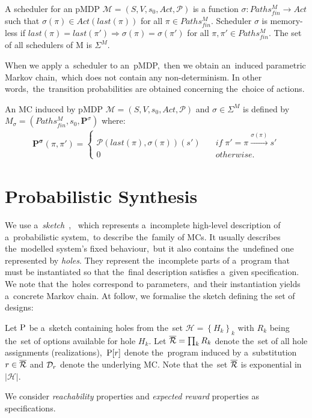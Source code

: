 \begin{definition}[Scheduler]
A scheduler for an pMDP $\mathcal{M} = (S, V, s_0, Act, \mathcal{P})$ is a function $\sigma: Paths_{fin}^{M} \rightarrow Act$ such that $\sigma(\pi) \in Act(last(\pi))$ for all $\pi \in Paths_{fin}^{M}$.
Scheduler $\sigma$ is memory-less if $last(\pi) = last(\pi') \Longrightarrow \sigma(\pi) = \sigma(\pi')$ for all $\pi, \pi' \in Paths_{fin}^{M}$.
The set of all schedulers of M is $\Sigma^M$.
\end{definition}
\noindent 
When we apply a~scheduler to an~pMDP,~then we obtain an~induced parametric Markov chain,~which does not contain any non-determinism.
In other words,~the~transition probabilities are obtained concerning the~choice of actions.

\begin{definition}[Induced MC] \label{def:incuded_mc}
\cite{cegar}
An MC induced by pMDP $\mathcal{M} = (S, V, s_0, Act, \mathcal{P})$ and $\sigma \in \Sigma^M$ is defined by $M_{\sigma} = ( Paths_{fin}^{M}, s_0, \mathbf{P}^{\sigma})$ where:
\begin{align*}
    \mathbf{P^{\sigma}}(\pi, \pi') = 
    \begin{cases}
        \mathcal{P}(last(\pi), \sigma(\pi))(s') \quad & if \; \pi' = \pi \overset{\sigma(\pi)}{\rightarrow} s' \\
         0 \quad & otherwise.
    \end{cases}
\end{align*}
\end{definition}


\section{Probabilistic Synthesis}
We use a~\textit{sketch}~\cite{sketching1,sygus}, ~which represents a~incomplete high-level description of a~probabilistic system,~to describe the~family of MCs.
It usually describes the~modelled system's fixed behaviour,~but it also contains the~undefined one represented by \textit{holes}.
They represent the~incomplete parts of a~program that must be instantiated so that the~final description satisfies a~given specification.
We note that the~holes correspond to parameters,~and their instantiation yields a~concrete Markov chain.
At follow, we formalise the sketch defining the set of designs:

\begin{definition}[Sketch]
Let $\mathrm{P}$ be a~sketch containing holes from the~set $\mathcal{H} = \left\{ H_k \right \}_k$ with $R_k$ being the~set of options available for hole $H_k$.
Let $\overline{\mathcal{R}} = \prod_k R_k$ denote the~set of all hole assignments (realizations),~$\mathrm{P}[r]$ denote the~program induced by a~substitution $r \in \overline{\mathcal{R}}$ and $\mathcal{D}_r$ denote the underlying MC.
Note that the~set $\overline{\mathcal{R}}$ is exponential in $\lvert \mathcal{H} \rvert$.
\end{definition}
\noindent
We consider \textit{reachability} properties and \textit{expected reward} properties as specifications.

